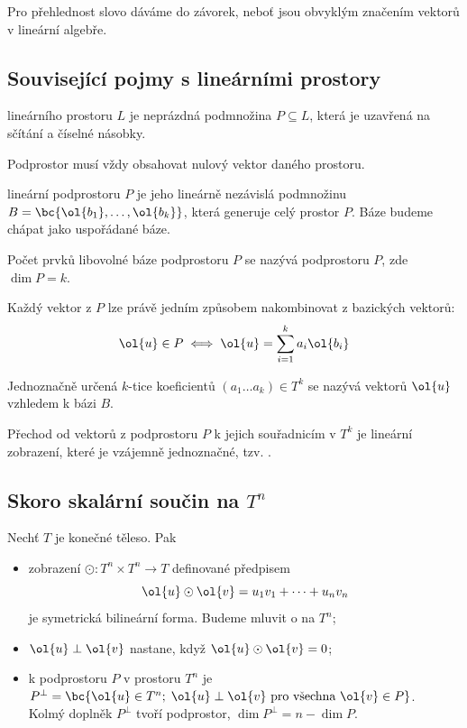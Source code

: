 Pro přehlednost slovo dáváme do závorek, neboť jsou obvyklým značením vektorů v lineární algebře.

\subsection{Související pojmy s lineárními prostory}
 lineárního prostoru $L$ je neprázdná podmnožina $P \subseteq L$, která je uzavřená na sčítání a číselné násobky.

Podprostor musí vždy obsahovat nulový vektor daného prostoru.

 lineární podprostoru $P$ je jeho lineárně nezávislá podmnožinu $B = \bc{\ol{b_1}, \dots, \ol{b_k}}$, která generuje celý prostor $P$. Báze budeme chápat jako uspořádané báze.

Počet prvků libovolné báze podprostoru $P$ se nazývá  podprostoru $P$, zde $\dim P = k$.

Každý vektor z $P$ lze právě jedním způsobem nakombinovat z bazických vektorů:
\begin{equation}
	\ol{u} \in P \iff \ol{u} = \sum_{i=1}^k a_i \ol{b_i}
\end{equation}

Jednoznačně určená $k$-tice koeficientů $(a_1 \dots a_k) \in T^k$ se nazývá  vektorů $\ol{u}$ vzhledem k bázi $B$.

Přechod od vektorů z podprostoru $P$ k jejich souřadnicím v $T^k$ je lineární zobrazení, které je vzájemně jednoznačné, tzv. .

\subsection{Skoro skalární součin na \texorpdfstring{$T^n$}{Tn}}
Nechť $T$ je konečné těleso. Pak
\vspace{-1em}
\begin{itemize}
	\item zobrazení $\odot : T^n \times T^n \rightarrow T$ definované předpisem
	\begin{equation}
		\ol{u} \odot \ol{v} = u_1 v_1 + \dots + u_n v_n
	\end{equation}
	je symetrická bilineární forma. Budeme mluvit o  na $T^n$;
	\item {} $\ol{u} \perp \ol{v}$ nastane, když $\ol{u} \odot \ol{v} = 0$;
	\item {} k podprostoru $P$ v prostoru $T^n$ je $P^\perp = \bc{\ol{u} \in T^n; \; \ol{u} \perp \ol{v} \text{ pro všechna } \ol{v} \in P}$.\\
	Kolmý doplněk $P^\perp$ tvoří podprostor, $\dim P^\perp = n - \dim P$.
\end{itemize}

